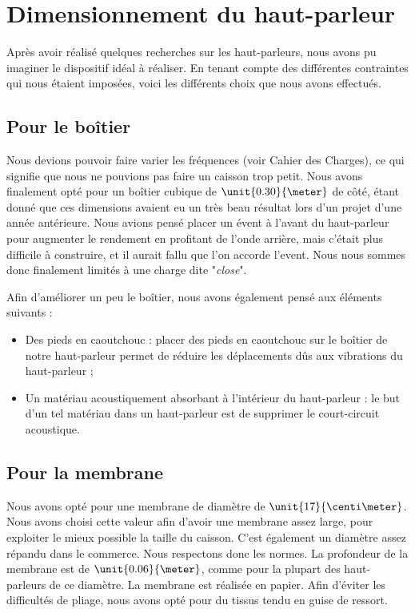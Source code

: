 

\section{Dimensionnement du haut-parleur}
Après avoir réalisé quelques recherches sur les haut-parleurs, nous avons pu imaginer le dispositif idéal 
à réaliser. En tenant compte des différentes contraintes qui nous étaient imposées, voici les différents 
choix que nous avons effectués.

\subsection{Pour le boîtier}
Nous devions pouvoir faire varier les fréquences (voir Cahier des Charges), ce qui signifie que nous ne 
pouvions pas faire un caisson trop petit. Nous avons finalement opté pour un boîtier cubique de 
$\unit{0.30}{\meter}$ de côté, étant donné que ces dimensions avaient eu un très beau résultat lors 
d'un projet d'une année antérieure. Nous avions pensé placer un évent à l'avant du haut-parleur 
pour augmenter le rendement en profitant de l'onde arrière, mais c'était plus difficile à construire, et 
il aurait fallu que l'on accorde l'event. Nous nous sommes donc finalement limités à une charge dite "\textit{close}"\cite{close}.  

Afin d'améliorer un peu le boîtier, nous avons également pensé aux éléments suivants :

\begin{itemize}
	\item	Des pieds en caoutchouc : placer des pieds en caoutchouc sur le boîtier de notre haut-parleur
				permet de réduire les déplacements dûs aux vibrations du haut-parleur ;
	\item	Un matériau acoustiquement absorbant à l'intérieur du haut-parleur : le but d'un tel matériau
				dans un haut-parleur est de supprimer le court-circuit acoustique\cite{absorber}.
\end{itemize}

\subsection{Pour la membrane}
Nous avons opté pour une membrane de diamètre de $\unit{17}{\centi\meter}$. Nous avons choisi cette valeur afin 
d'avoir une membrane assez large, pour exploiter le mieux possible la taille du caisson. C'est également un
diamètre assez répandu dans le commerce\cite{tlhp}. Nous respectons donc les normes.
La profondeur de la membrane est de $\unit{0.06}{\meter}$, comme pour la plupart des haut-parleurs de ce
diamètre\cite{tlhp}. La membrane est réalisée en papier. Afin d'éviter les difficultés de pliage, nous avons opté pour
du tissus tendu en guise de ressort. 

